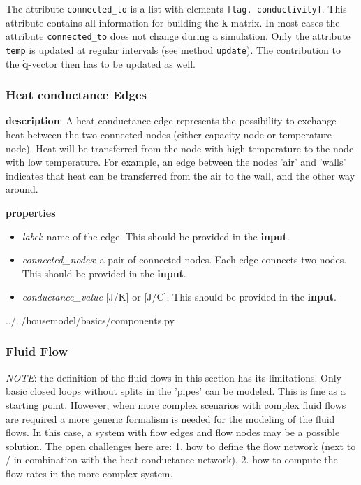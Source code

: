 The attribute \texttt{connected\_to} is a list with elements \texttt{[tag, conductivity]}. This attribute contains all information for building the \textbf{k}-matrix. In most cases the attribute \texttt{connected\_to} does not change during a simulation. Only the attribute \texttt{temp} is updated at regular intervals (see method \texttt{update}). The contribution to the $\mathbf{\dot{q}}$-vector then has to be updated as well.

\subsubsection{Heat conductance Edges}
\textbf{description}: A heat conductance edge represents the possibility to exchange heat between the two connected nodes (either capacity node or temperature node). Heat will be transferred from the node with high temperature to the node with low temperature. For example, an edge between the nodes 'air' and 'walls' indicates that heat can be transferred from the air to the wall, and the other way around.  

\textbf{properties}
\begin{itemize}
	\item \emph{label}: name of the edge. This should be provided in the \textbf{input}.
	\item \emph{connected\_nodes}: a pair of connected nodes. Each edge connects two nodes. This should be provided in the \textbf{input}. 
	\item \emph{conductance\_value} [J/K] or [J/\degree C]. This should be provided in the \textbf{input}.
\end{itemize}

 
{../../housemodel/basics/components.py}

\subsubsection{Fluid Flow}
\emph{NOTE}: the definition of the fluid flows in this section has its limitations. Only basic closed loops without splits in the 'pipes' can be modeled. This is fine as a starting point. However, when more complex scenarios with complex fluid flows are required a more generic formalism is needed for the modeling of the fluid flows. In this case, a system with flow edges and flow nodes may be a possible solution. The open challenges here are: 1. how to define the flow network (next to / in combination with the heat conductance network),  2. how to compute the flow rates in the more complex system. 

